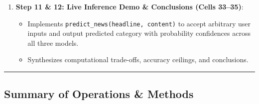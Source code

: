 \documentclass[12pt,a4paper,oneside]{report}
\providecommand{\tightlist}{\setlength{\itemsep}{0pt}\setlength{\parskip}{0pt}}
\begin{document}
\begin{enumerate}
  \begin{itemize}
  \tightlist
  \item
    Evaluates test predictions across all 3 models: Accuracy, Macro Precision, Macro Recall, and Macro F1-Score.
  \item
    Computes normalized confusion matrices plotted side-by-side (3-panel heatmap).
  \item
    Generates a per-class F1-score Radar (Spider) chart contrasting category-specific strengths.
  \item
    Performs qualitative error analysis filtering instances where models disagreed, analyzing why boundary examples (e.g.~tech business acquisitions) cause misclassifications.
  \end{itemize}
\item
  \textbf{Step 11 \& 12: Live Inference Demo \& Conclusions (Cells 33--35)}:

  \begin{itemize}
  \tightlist
  \item
    Implements \texttt{predict\_news(headline,\ content)} to accept arbitrary user inputs and output predicted category with probability confidences across all three models.
  \item
    Synthesizes computational trade-offs, accuracy ceilings, and conclusions.
  \end{itemize}
\end{enumerate}

\begin{center}\rule{0.5\linewidth}{0.5pt}\end{center}

\hypertarget{summary-of-operations-methods}{%
\subsection{Summary of Operations \& Methods}\label{summary-of-operations-methods}}
\end{document}
